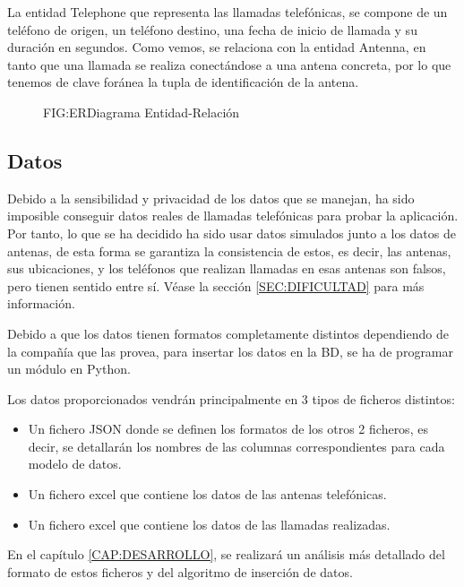     La entidad Telephone que representa las llamadas telefónicas, se compone de un teléfono de origen, un teléfono destino, una fecha de inicio de llamada y su duración en segundos. Como vemos, se relaciona con la entidad Antenna, en tanto que una llamada se realiza conectándose a una antena concreta, por lo que tenemos de clave foránea la tupla de identificación de la antena.
    
    \begin{figure}[Diagrama Entidad-Relación]{FIG:ER}{Diagrama Entidad-Relación}
    \end{figure}
       
       
  \subsection{Datos}
    Debido a la sensibilidad y privacidad de los datos que se manejan, ha sido imposible conseguir datos reales de llamadas telefónicas para probar la aplicación. Por tanto, lo que se ha decidido ha sido usar datos simulados junto a los datos de antenas, de esta forma se garantiza la consistencia de estos, es decir, las antenas, sus ubicaciones, y los teléfonos que realizan llamadas en esas antenas son falsos, pero tienen sentido entre sí. Véase la sección \ref{SEC:DIFICULTAD} para más información.

    Debido a que los datos tienen formatos completamente distintos dependiendo de la compañía que las provea, para insertar los datos en la BD, se ha de programar un módulo en Python.
    
    Los datos proporcionados vendrán principalmente en 3 tipos de ficheros distintos:
    \begin{itemize}
      \item Un fichero JSON donde se definen los formatos de los otros 2 ficheros, es decir, se detallarán los nombres de las columnas correspondientes para cada modelo de datos.
      \item Un fichero excel que contiene los datos de las antenas telefónicas.
      \item Un fichero excel que contiene los datos de las llamadas realizadas.
    \end{itemize}
  
    En el capítulo \ref{CAP:DESARROLLO}, se realizará un análisis más detallado del formato de estos ficheros y del algoritmo de inserción de datos.